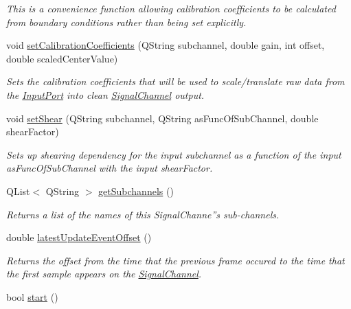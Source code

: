 \begin{DoxyCompactItemize}
\begin{DoxyCompactList}\small\item\em This is a convenience function allowing calibration coefficients to be calculated from boundary conditions rather than being set explicitly. \end{DoxyCompactList}\item 
void \hyperlink{class_picto_1_1_signal_channel_a0ce11ac4f994305a7ab6bcdaf7b3c328}{set\-Calibration\-Coefficients} (Q\-String subchannel, double gain, int offset, double scaled\-Center\-Value)
\begin{DoxyCompactList}\small\item\em Sets the calibration coefficients that will be used to scale/translate raw data from the \hyperlink{class_picto_1_1_input_port}{Input\-Port} into clean \hyperlink{class_picto_1_1_signal_channel}{Signal\-Channel} output. \end{DoxyCompactList}\item 
void \hyperlink{class_picto_1_1_signal_channel_a31ea4dcd66df875c9c2f2747512648ef}{set\-Shear} (Q\-String subchannel, Q\-String as\-Func\-Of\-Sub\-Channel, double shear\-Factor)
\begin{DoxyCompactList}\small\item\em Sets up shearing dependency for the input subchannel as a function of the input as\-Func\-Of\-Sub\-Channel with the input shear\-Factor. \end{DoxyCompactList}\item 
\hypertarget{class_picto_1_1_signal_channel_a327145a1afab63b79decc0d8472ac989}{Q\-List$<$ Q\-String $>$ \hyperlink{class_picto_1_1_signal_channel_a327145a1afab63b79decc0d8472ac989}{get\-Subchannels} ()}\label{class_picto_1_1_signal_channel_a327145a1afab63b79decc0d8472ac989}

\begin{DoxyCompactList}\small\item\em Returns a list of the names of this Signal\-Channe''s sub-\/channels. \end{DoxyCompactList}\item 
double \hyperlink{class_picto_1_1_signal_channel_a656a421939ffd3f75fad08289e5f3ba2}{latest\-Update\-Event\-Offset} ()
\begin{DoxyCompactList}\small\item\em Returns the offset from the time that the previous frame occured to the time that the first sample appears on the \hyperlink{class_picto_1_1_signal_channel}{Signal\-Channel}. \end{DoxyCompactList}\item 
\hypertarget{class_picto_1_1_signal_channel_a96f537342b8c367f0865398dda7322a4}{bool \hyperlink{class_picto_1_1_signal_channel_a96f537342b8c367f0865398dda7322a4}{start} ()}\label{class_picto_1_1_signal_channel_a96f537342b8c367f0865398dda7322a4}


\end{DoxyCompactItemize}
